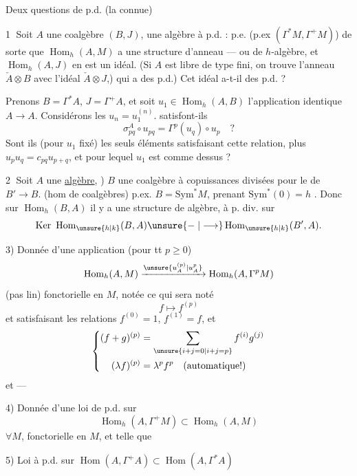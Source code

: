 Deux questions de p.d. (la  connue)

\textcircled{1} Soit $A$ une coalgèbre  $(B,J)$, une algèbre à p.d. : p.e. (p.ex $(\Gamma^*M,\Gamma^+M)$) de sorte que $\operatorname{Hom}_h(A,M)$ a une structure d’anneau --- ou de $h$-algèbre, et $\operatorname{Hom}_h(A,J)$ en est un idéal. (Si $A$ est libre de type fini, on trouve l’anneau $\check A\otimes B$ avec l’idéal $\check A\otimes J$,) qui a des p.d.) Cet idéal a-t-il des p.d. ?

 Prenons $B=\Gamma^*A$, $J=\Gamma^+A$, et soit $u_1\in\operatorname{Hom}_h(A,B)$ l’application identique $A\longrightarrow A$. Considérons les $u_n=u_1^{(n)}$. satisfont-ils
\[
\sigma_{pq}^A\circ u_{pq}=\Gamma^p(u_q)\circ u_p\quad ?
\]
Sont ils (pour $u_1$ fixé) les seuls éléments  satisfaisant cette relation, plus $u_pu_q=c_{pq}u_{p+q}$, et pour lequel $u_1$ est comme dessus ?

\textcircled{2} Soit $A$ une \uline{algèbre}, ) $B$ une coalgèbre à copuissances divisées pour le  de $B'\longrightarrow B$. (hom de coalgèbres) p.ex. $B=\mathrm{Sym}^*M$, prenant $\mathrm{Sym}^*(0)=h$ \unsure{---}. Donc sur $\operatorname{Hom}_h(B,A)$ il y a une structure de  algèbre, à p. div. sur
\[
\operatorname{Ker}\ \operatorname{Hom}_{\unsure{h|k}}(B,A)\unsure{\mathrel{-}|\longrightarrow}\operatorname{Hom}_{\unsure{h|k}}(B',A).
\]

3) Donnée d'une application (pour tt $p\geq0$)
\[
\operatorname{Hom}_h(A,M)\xrightarrow{\unsure{u_A^{(p)}|u_A^p}}\operatorname{Hom}_h(A,\Gamma^p M)
\]
(pas  lin) fonctorielle en $M$, notée
ce qui  sera noté
\[
f\longmapsto f^{(p)}
\]
et satisfaisant les relations $f^{(0)}=1$, $f^{(1)}=f$, et
\[
\left\{\begin{aligned}
(f+g)^{(p)}&=\sum_{\unsure{i+j=0|i+j=p}} f^{(i)}g^{(j)}\\
(\lambda f)^{(p)}&=\lambda^p f^p\quad\text{(automatique!)}
\end{aligned}\right.
\]
et ---

4) Donnée d'une loi de p.d. sur
\[
\operatorname{Hom}_h(A,\Gamma^+M)\subset\operatorname{Hom}_h(A,M)
\]
$\forall M$, fonctorielle en $M$, et telle que

5) Loi à p.d. sur $\operatorname{Hom}(A,\Gamma^+A)\subset\operatorname{Hom}(A,\Gamma^*A)$

